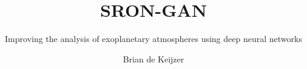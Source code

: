 \documentclass[whitelogo]{template/tudelft-report}
\begin{document}
\frontmatter



\title[tudelft-white]{SRON-GAN}
\subtitle[tudelft-black]{\Huge{Improving the analysis of exoplanetary atmospheres using deep neural networks}}
\author[tudelft-white]{Brian de Keijzer}
\makecover[split]







\tableofcontents




\mainmatter








\nocite{*}



\appendix




\end{document}
